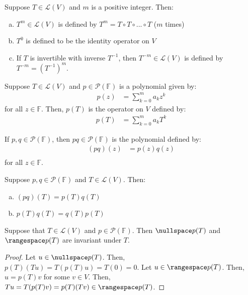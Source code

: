\documentclass{article}
\begin{document}
\begin{definition}[$T^m$]
  Suppose $T \in \mathcal{L}(V)$ and $m$ is a positive integer. Then:
  \begin{enumerate}[(a)]
  \item
    $T^m \in \mathcal{L}(V)$ is defined by $T^m = T \circ T \circ
    ... \circ T$ ($m$ times)
  \item
    $T^0$ is defined to be the identity operator on $V$
  \item
    If $T$ is invertible with inverse $T^{-1}$, then $T^{-m} \in
    \mathcal{L}(V)$ is defined by $T^{-m} = (T^{-1})^m$.
  \end{enumerate}
\end{definition}

\begin{definition}[$p(T)$]
  Suppose $T \in \mathcal{L}(V)$ and $p \in \mathcal{P}(\mathbb{F})$
  is a polynomial given by:
  \begin{align*}
    p(z) &= \sum_{k=0}^m a_k z^k
  \end{align*}
  for all $z \in \mathbb{F}$. Then, $p(T)$ is the operator on $V$
  defined by:
  \begin{align*}
    p(T) &= \sum_{k=0}^m a_k T^k
  \end{align*}
\end{definition}

\begin{definition}
  If $p, q \in \mathcal{P}(\mathbb{F})$, then $pq \in
  \mathcal{P}(\mathbb{F})$ is the polynomial defined by:
  \begin{align*}
    (pq)(z) &= p(z) q(z) \\
  \end{align*}
  for all $z \in \mathbb{F}$. 
\end{definition}

\begin{theorem}
  \label{thm:multiplicative-properties-of-polynomials}
  Suppose $p, q \in \mathcal{P}(\mathbb{F})$ and $T \in
  \mathcal{L}(V)$. Then:
  \begin{enumerate}[(a)]
  \item
    $(pq)(T) = p(T)q(T)$
  \item
    $p(T)q(T) = q(T)p(T)$
  \end{enumerate}
\end{theorem}

\begin{theorem}
  \label{thm:null-space-and-range-of-pT-are-invariant-under-T}
  Suppose that $T \in \mathcal{L}(V)$ and $p \in
  \mathcal{P}(\mathbb{F})$. Then $\nullspace p(T)$ and $\rangespace
  p(T)$ are invariant under $T$.

\end{theorem}
\begin{proof}
  Let $u \in \nullspace p(T)$. Then, $p(T)(Tu) = T(p(T)u) = T(0) =
  0$. Let $u \in \rangespace p(T)$. Then, $u = p(T)v$ for some $v \in
  V$. Then, $Tu = T(p(T)v) = p(T)(Tv) \in \rangespace p(T)$.
\end{proof}
\end{document}

